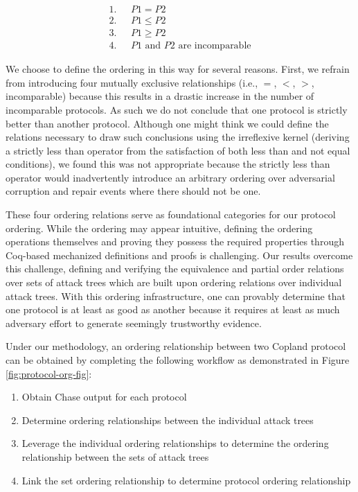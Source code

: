 \documentclass[runningheads]{llncs}
\theoremstyle{definition}
\newcommand{\squash}{\itemsep=0pt\parskip=0pt}
\begin{document}
\vspace*{-5mm}

\begin{align*}
1. & \text{ } P1 = P2 \\
2. & \text{ } P1 \le P2 \\
3. & \text{ } P1 \ge P2 \\
4. & \text{ } P1 \text{ and } P2 \text{ are incomparable}
\end{align*}

\noindent We choose to define the ordering in this way for several
reasons. First, we refrain from introducing four mutually exclusive
relationships (i.e., $=$, $<$, $>$, incomparable) because this results
in a drastic increase in the number of incomparable protocols. As such
we do not conclude that one protocol is strictly better than another
protocol. Although one might think we could define the relations
necessary to draw such conclusions using the irreflexive kernel
(deriving a strictly less than operator from the satisfaction of both
less than and not equal conditions), we found this was not appropriate
because the strictly less than operator would inadvertently introduce
an arbitrary ordering over adversarial corruption and repair events
where there should not be one.


These four ordering relations serve as foundational categories for our
protocol ordering. While the ordering may appear intuitive, defining
the ordering operations themselves and proving they possess the
required properties through Coq-based mechanized definitions and
proofs is challenging. Our results overcome this challenge, defining
and verifying the equivalence and partial order relations over sets of
attack trees which are built upon ordering relations over individual
attack trees. With this ordering infrastructure, one can provably
determine that one protocol is at least as good as another because it
requires at least as much adversary effort to generate seemingly
trustworthy evidence. 

Under our methodology, an ordering relationship between two Copland
protocol can be obtained by completing the following workflow as
demonstrated in Figure  \ref{fig:protocol-org-fig}: 

\begin{enumerate}
    \squash
    \item Obtain Chase output for each protocol
    \item Determine ordering relationships between the individual attack trees
    \item Leverage the individual ordering relationships to determine the ordering relationship between the sets of attack trees
    \item Link the set ordering relationship to determine protocol ordering relationship
\end{enumerate}
\end{document}
